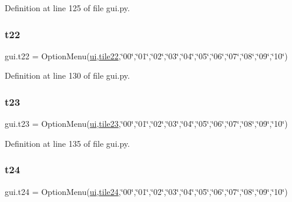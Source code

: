 Definition at line 125 of file gui.\+py.

\mbox{\label{namespacegui_ae55c578f963d2fb950b90472aefb2568}} 
\subsubsection{\texorpdfstring{t22}{t22}}
{\footnotesize\ttfamily gui.\+t22 = Option\+Menu(\mbox{\hyperlink{namespacegui_a40ab7281456eadbea2dc2038f5c24fa1}{ui}},\mbox{\hyperlink{namespacegui_a70aa21cb6ac54c9f4b78b33bb1b2a950}{tile22}},\char`\"{}00\char`\"{},\char`\"{}01\char`\"{},\char`\"{}02\char`\"{},\char`\"{}03\char`\"{},\char`\"{}04\char`\"{},\char`\"{}05\char`\"{},\char`\"{}06\char`\"{},\char`\"{}07\char`\"{},\char`\"{}08\char`\"{},\char`\"{}09\char`\"{},\char`\"{}10\char`\"{})}



Definition at line 130 of file gui.\+py.

\mbox{\label{namespacegui_a0414c77dd058a679fbc1b6536aa4340c}} 
\subsubsection{\texorpdfstring{t23}{t23}}
{\footnotesize\ttfamily gui.\+t23 = Option\+Menu(\mbox{\hyperlink{namespacegui_a40ab7281456eadbea2dc2038f5c24fa1}{ui}},\mbox{\hyperlink{namespacegui_afd8283fde2bbc574d953eeedbcfdcedb}{tile23}},\char`\"{}00\char`\"{},\char`\"{}01\char`\"{},\char`\"{}02\char`\"{},\char`\"{}03\char`\"{},\char`\"{}04\char`\"{},\char`\"{}05\char`\"{},\char`\"{}06\char`\"{},\char`\"{}07\char`\"{},\char`\"{}08\char`\"{},\char`\"{}09\char`\"{},\char`\"{}10\char`\"{})}



Definition at line 135 of file gui.\+py.

\mbox{\label{namespacegui_a9757799e039723f8052236cdf71a2969}} 
\subsubsection{\texorpdfstring{t24}{t24}}
{\footnotesize\ttfamily gui.\+t24 = Option\+Menu(\mbox{\hyperlink{namespacegui_a40ab7281456eadbea2dc2038f5c24fa1}{ui}},\mbox{\hyperlink{namespacegui_a5f2cfe715c136f8cae1ea50bd8081a50}{tile24}},\char`\"{}00\char`\"{},\char`\"{}01\char`\"{},\char`\"{}02\char`\"{},\char`\"{}03\char`\"{},\char`\"{}04\char`\"{},\char`\"{}05\char`\"{},\char`\"{}06\char`\"{},\char`\"{}07\char`\"{},\char`\"{}08\char`\"{},\char`\"{}09\char`\"{},\char`\"{}10\char`\"{})}



